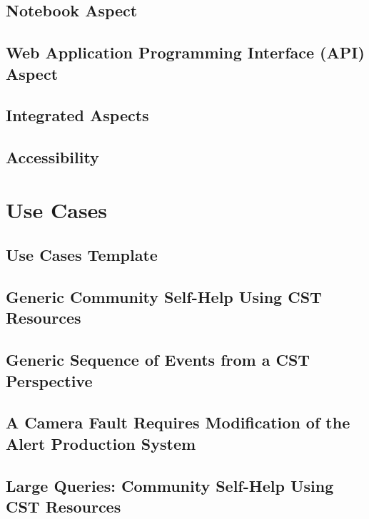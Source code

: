 \documentclass[DM,lsstdraft,authoryear,toc]{lsstdoc}
\begin{document}
\clearpage
\subsection{Notebook Aspect}


\clearpage
\subsection{Web Application Programming Interface (API) Aspect}


\clearpage
\subsection{Integrated Aspects}


\clearpage
\subsection{Accessibility}


\clearpage
\section{Use Cases}

\clearpage
\subsection{Use Cases Template}


\clearpage
\subsection{Generic Community Self-Help Using CST Resources}


\clearpage
\subsection{Generic Sequence of Events from a CST Perspective}


\clearpage
\subsection{A Camera Fault Requires Modification of the Alert Production System}


\clearpage
\subsection{Large Queries: Community Self-Help Using CST Resources}

\end{document}
